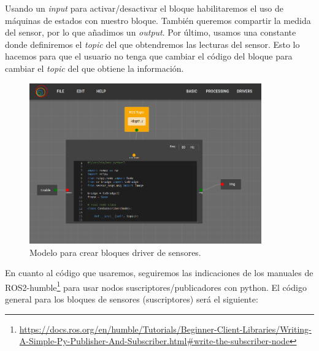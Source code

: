 Usando un \textit{input} para activar/desactivar el bloque habilitaremos el uso de máquinas de estados con nuestro bloque.
También queremos compartir la medida del sensor, por lo que añadimos un \textit{output}. Por último, usamos una constante donde definiremos
el \textit{topic} del que obtendremos las lecturas del sensor. Esto lo hacemos para que el usuario no tenga que cambiar el código del bloque para cambiar
el \textit{topic} del que obtiene la información.\\
\begin{figure} [H]
  \begin{center}
      \includegraphics[width=10cm]{figs/c4/VC_driver_blocks.png}
  \end{center}
  \caption[Modelo bloque driver sensores]{Modelo para crear bloques driver de sensores.}
  \label{fig:VC_driver_model}
\end{figure}

En cuanto al código que usaremos, seguiremos las indicaciones de los manuales de
ROS2-humble\footnote{\url{https://docs.ros.org/en/humble/Tutorials/Beginner-Client-Libraries/Writing-A-Simple-Py-Publisher-And-Subscriber.html\#write-the-subscriber-node}}
para usar nodos suscriptores/publicadores con python. El código general para los bloques de sensores (suscriptores) será el siguiente:

